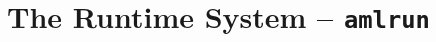 
\chapter[The Runtime System -- amlrun]{The Runtime System -- \lstinline!amlrun!}
\label{sec:tools-amlrun}








